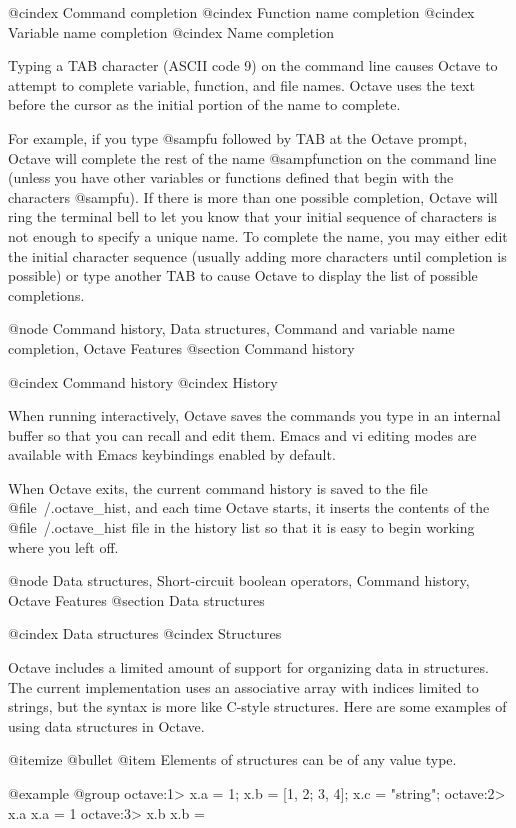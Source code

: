 @cindex Command completion
@cindex Function name completion
@cindex Variable name completion
@cindex Name completion

Typing a TAB character (ASCII code 9) on the command line causes Octave
to attempt to complete variable, function, and file names.  Octave uses
the text before the cursor as the initial portion of the name to
complete.

For example, if you type @samp{fu} followed by TAB at the Octave prompt,
Octave will complete the rest of the name @samp{function} on the command
line (unless you have other variables or functions defined that begin
with the characters @samp{fu}).  If there is more than one possible
completion, Octave will ring the terminal bell to let you know that your
initial sequence of characters is not enough to specify a unique name.
To complete the name, you may either edit the initial character sequence
(usually adding more characters until completion is possible) or type
another TAB to cause Octave to display the list of possible completions.

@node Command history, Data structures, Command and variable name completion, Octave Features
@section Command history

@cindex Command history
@cindex History

When running interactively, Octave saves the commands you type in an
internal buffer so that you can recall and edit them.  Emacs and vi
editing modes are available with Emacs keybindings enabled by default.

When Octave exits, the current command history is saved to the file
@file{~/.octave_hist}, and each time Octave starts, it inserts the
contents of the @file{~/.octave_hist} file in the history list so that
it is easy to begin working where you left off.

@node Data structures, Short-circuit boolean operators, Command history, Octave Features
@section Data structures

@cindex Data structures
@cindex Structures

Octave includes a limited amount of support for organizing data in
structures.  The current implementation uses an associative array
with indices limited to strings, but the syntax is more like C-style
structures.  Here are some examples of using data structures in Octave.

@itemize @bullet
@item Elements of structures can be of any value type.

@example
@group
octave:1> x.a = 1; x.b = [1, 2; 3, 4]; x.c = "string";
octave:2> x.a
x.a = 1
octave:3> x.b
x.b =

